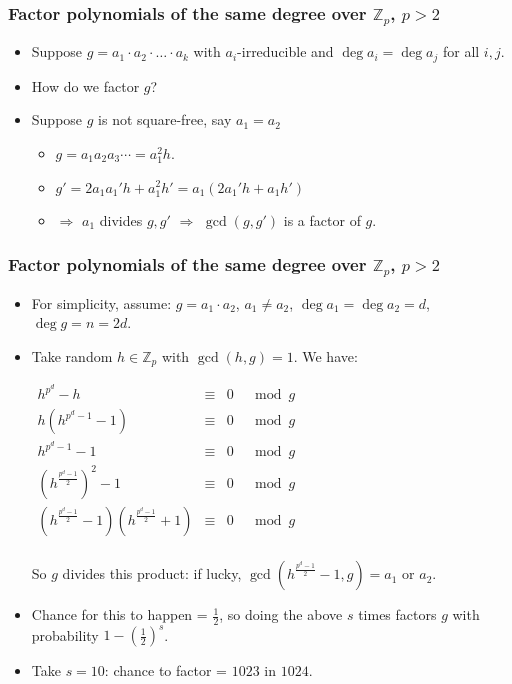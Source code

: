\begin{frame}
\frametitle{Factor polynomials of the same degree over $\mathbb Z_p$, $p>2$}
\begin{itemize}
\item Suppose $ g=a_1\cdot a_2\cdot \dots \cdot a_k$ with $a_i$-irreducible and $\deg a_i=\deg a_j$ for all $i,j$.
\item How do we factor $g$?
\item Suppose $g$ is not square-free, say $a_1=a_2$
\begin{itemize}
\item $g= a_1a_2 a_3\cdots= a_1^2  h$.
\item $g'= 2a_1 a_1' h+ a_1^2 h'=a_1(2a_1'h+a_1h')$ 
\item $\Rightarrow$ $a_1$ divides $g, g' $ $\Rightarrow$ $\gcd(g,g')$ is a factor of $g$.
\end{itemize} 
\end{itemize}
\end{frame}

\begin{frame}
\frametitle{Factor polynomials of the same degree over $\mathbb Z_p$, $p>2$}
\begin{itemize}
\item For simplicity, assume: $g=a_1\cdot a_2$, $a_1\neq a_2$, $\deg a_1=\deg a_2=d$, $\deg g=n=2d$. 
\item  Take random $h\in \mathbb Z_p$ with $\gcd(h,g)=1$. We have:

\hfil \hfil $
\begin{array}{rcll}
h^{p^d}-h &\equiv &0&\mod g\\
h\left(h^{p^d-1}-1 \right)& \equiv &0&\mod g \\
h^{p^d-1}-1&\equiv&0&\mod g\\
\left( h^{\frac{p^d-1}{2}}\right)^2 - 1&\equiv&0& \mod g\\
\left( h^{\frac{p^d-1}{2}} - 1\right)\left( h^{\frac{p^d-1}{2}}+ 1\right) &\equiv&0& \mod g\\
\end{array}
$

So $g$ divides this product: if lucky, $\gcd\left(h^{\frac{p^d-1}{2}} - 1,g\right)=a_1$ or $a_2$.

\item Chance for this to happen = $\frac{1}{2}$, so doing the above $s$ times factors $g$ with probability $1-\left(\frac{1}{2} \right)^s$. 
\item Take $s=10$: chance to factor = $1023$ in $1024$.
\end{itemize}
\end{frame}